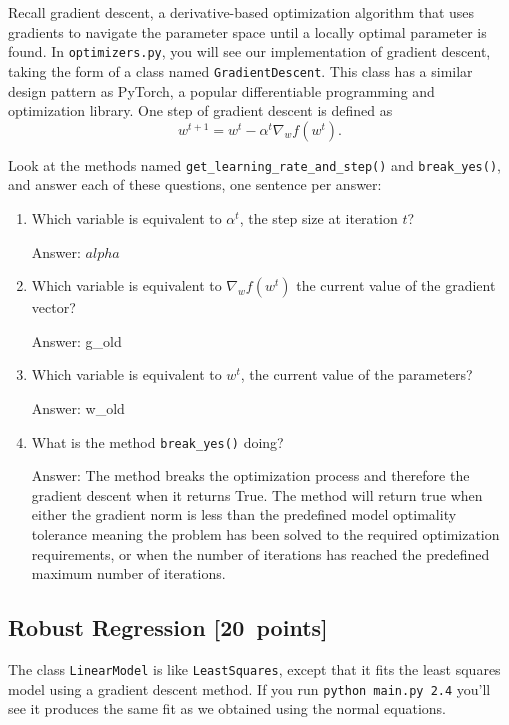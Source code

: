 \documentclass{article}
\newcommand{\blu}[1]{{\textcolor{blu}{#1}}}
\newenvironment{answer}{\par\begingroup\color{gre}Answer: }{\endgroup}
\let\ask\blu
\newcommand\pts[1]{\textcolor{pointscolour}{[#1~points]}}
\begin{document}
Recall gradient descent, a derivative-based optimization algorithm that uses gradients to navigate the parameter space until a locally optimal parameter is found. In \texttt{optimizers.py}, you will see our implementation of gradient descent, taking the form of a class named \texttt{GradientDescent}. This class has a similar design pattern as PyTorch, a popular differentiable programming and optimization library. One step of gradient descent is defined as
\[
	w^{t+1} = w^t - \alpha^t \nabla_w f(w^t)
.\]

Look at the methods named \texttt{get\_learning\_rate\_and\_step()} and \texttt{break\_yes()}, and \ask{answer each of these questions, one sentence per answer:}
\begin{enumerate}
	\item Which variable is equivalent to $\alpha^t$, the step size at iteration $t$?
 \begin{answer}
 $alpha$
 \end{answer}
	\item Which variable is equivalent to $\nabla_w f(w^t)$ the current value of the gradient vector?
 \begin{answer}
 g\_old
 \end{answer}
	\item Which variable is equivalent to $w^t$, the current value of the parameters?
 \begin{answer}
 w\_old
 \end{answer}
	\item What is the method \texttt{break\_yes()} doing?
     \begin{answer}
     The method breaks the optimization process and therefore the gradient descent when it returns True. The method will return true when either the gradient norm is less than the predefined model optimality tolerance meaning the problem has been solved to the required optimization requirements, or when the number of iterations has reached the predefined maximum number of iterations.
     \end{answer}
\end{enumerate}
\newpage

\subsection{Robust Regression \pts{20}}

The class \texttt{LinearModel} is like \texttt{LeastSquares}, except that it fits the least squares model using a gradient descent method. If you run \verb|python main.py 2.4| you'll see it produces the same fit as we obtained using the normal equations.
\end{document}
